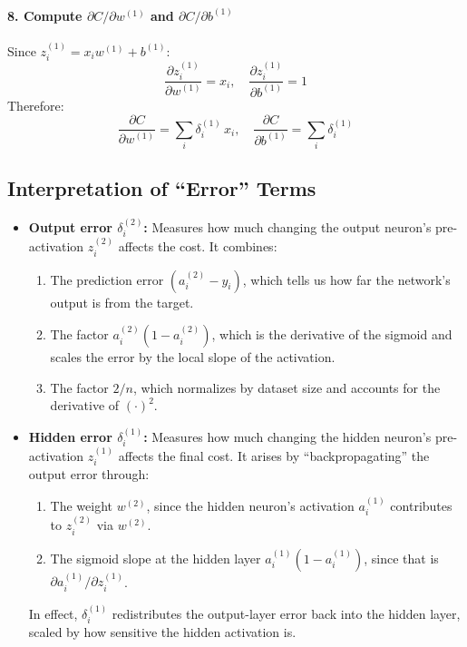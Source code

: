 \documentclass{article}
\begin{document}
\paragraph{8. Compute \(\partial C/\partial w^{(1)}\) and \(\partial C/\partial b^{(1)}\)\\}
Since \(z_i^{(1)} = x_i w^{(1)} + b^{(1)}\):
\[
    \frac{\partial z_i^{(1)}}{\partial w^{(1)}} = x_i,
    \quad
    \frac{\partial z_i^{(1)}}{\partial b^{(1)}} = 1
\]
Therefore:
\[
    \frac{\partial C}{\partial w^{(1)}} = \sum_i \delta_i^{(1)}\,x_i,
    \quad
    \frac{\partial C}{\partial b^{(1)}} = \sum_i \delta_i^{(1)}
\]

\subsection{Interpretation of ``Error'' Terms}\label{sec:two-neuron-error-interpretation}

\begin{itemize}
    \item \textbf{Output error \(\delta_i^{(2)}\):}  Measures how much changing the output neuron's pre-activation \(z_i^{(2)}\) affects the cost.  It combines:
    \begin{enumerate}
        \item The 
        prediction error \((a_i^{(2)} - y_i)\), which tells us how far the network's output is from the target.
        \item The factor \(a_i^{(2)}(1 - a_i^{(2)})\), which is the derivative of the sigmoid and scales the error by the local slope of the activation.
        \item The factor \(2/n\), which normalizes by dataset size and accounts for the derivative of \({(\cdot)}^2\).
    \end{enumerate}

    \item \textbf{Hidden error \(\delta_i^{(1)}\):}  Measures how much changing the hidden neuron's pre-activation \(z_i^{(1)}\) affects the final cost.  It arises by “backpropagating” the output error through:
    \begin{enumerate}
        \item The weight \(w^{(2)}\), since the hidden neuron's activation \(a_i^{(1)}\) contributes to \(z_i^{(2)}\) via \(w^{(2)}\).
        \item The sigmoid slope at the hidden layer \(a_i^{(1)}(1 - a_i^{(1)})\), since that is \(\partial a_i^{(1)}/\partial z_i^{(1)}\).
    \end{enumerate}
    In effect, \(\delta_i^{(1)}\) redistributes the output-layer error back into the hidden layer, scaled by how sensitive the hidden activation is.
\end{itemize}
\end{document}
